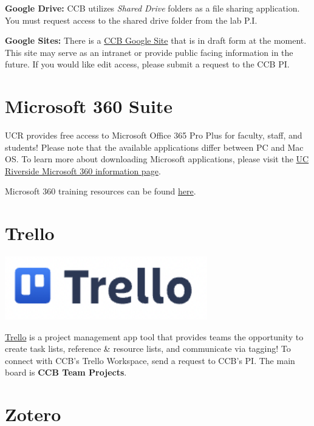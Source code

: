 \documentclass[
]{book}
\begin{document}
\textbf{Google Drive:} CCB utilizes \emph{Shared Drive} folders as a file sharing application. You must request access to the shared drive folder from the lab P.I.

\textbf{Google Sites:} There is a \href{https://sites.google.com/ucr.edu/ccbucr/home}{CCB Google Site} that is in draft form at the moment. This site may serve as an intranet or provide public facing information in the future. If you would like edit access, please submit a request to the CCB PI.

\hypertarget{microsoft-360-suite}{%
\section{Microsoft 360 Suite}\label{microsoft-360-suite}}

UCR provides free access to Microsoft Office 365 Pro Plus for faculty, staff, and students! Please note that the available applications differ between PC and Mac OS. To learn more about downloading Microsoft applications, please visit the
\href{https://ucrsupport.service-now.com/ucr_portal/?id=kb_article\&sys_id=0868da980f602f0086b7c7dce1050ee0}{UC Riverside Microsoft 360 information page}.

Microsoft 360 training resources can be found \href{https://support.microsoft.com/en-us/office?ui=en-us\&rs=en-us\&ad=us}{here}.

\hypertarget{trello}{%
\section{Trello}\label{trello}}

\begin{flushleft}\includegraphics[width=3.47in]{images/trello} \end{flushleft}

\href{https://trello.com/en}{Trello} is a project management app tool that provides teams the opportunity to create task lists, reference \& resource lists, and communicate via tagging! To connect with CCB's Trello Workspace, send a request to CCB's PI. The main board is \textbf{CCB Team Projects}.

\hypertarget{zotero}{%
\section{Zotero}\label{zotero}}
\end{document}

